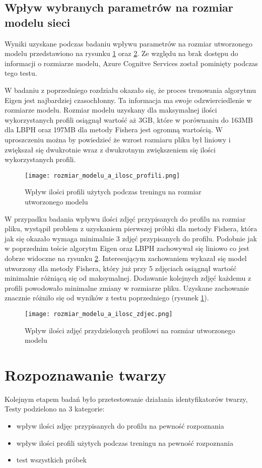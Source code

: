 \subsection{Wpływ wybranych parametrów na rozmiar modelu sieci}
Wyniki uzyskane podczas badaniu wpływu parametrów na rozmiar utworzonego modelu przedstawiono na rysunku \ref{fig:rozmiar_profile} oraz \ref{fig:rozmiar_zdjecia}. Ze względu na brak dostępu do informacji o rozmiarze modelu, Azure Cognitve Services został pominięty podczas tego testu.

W badaniu z poprzedniego rozdziału okazało się, że proces trenowania algorytmu Eigen jest najbardziej czasochłonny. Ta informacja ma swoje odzwierciedlenie w rozmiarze modelu. Rozmiar modelu uzyskany dla maksymalnej ilości wykorzystanych profili osiągnął wartość aż 3GB, które w porównaniu do 163MB dla LBPH oraz 197MB dla metody Fishera jest ogromną wartością. W uproszczeniu można by powiedzieć że wzrost rozmiaru pliku był liniowy i zwiększał się dwukrotnie wraz z dwukrotnym zwiększeniem się ilości wykorzystanych profili. 
\begin{figure}[H]
	\centering
	\texttt{[image: rozmiar\_modelu\_a\_ilosc\_profili.png]}
	\caption{Wpływ ilości profili użytych podczas treningu na rozmiar utworzonego modelu}
	\label{fig:rozmiar_profile}
\end{figure}
W przypadku badania wpływu ilości zdjęć przypisanych do profilu na rozmiar pliku, wystąpił problem z uzyskaniem pierwszej próbki dla metody Fishera, która jak się okazało wymaga minimalnie 3 zdjęć przypisanych do profilu. Podobnie jak w poprzednim teście algorytm Eigen oraz LBPH zachowywał się liniowo co jest dobrze widoczne na rysunku \ref{fig:rozmiar_zdjecia}. Interesującym zachowaniem wykazał się model utworzony dla metody Fishera, który już przy 5 zdjęciach osiągnął wartość minimalnie różniącą się od maksymalnej. Dodawanie kolejnych zdjęć każdemu z profili powodowało minimalne zmiany w rozmiarze pliku. Uzyskane zachowanie znacznie różniło się od wyników z testu poprzedniego (rysunek \ref{fig:rozmiar_profile}).
\begin{figure}[H]
	\centering
	\texttt{[image: rozmiar\_modelu\_a\_ilosc\_zdjec.png]}
	\caption{Wpływ ilości zdjęć przydzielonych profilowi na rozmiar utworzonego modelu}
	\label{fig:rozmiar_zdjecia}
\end{figure}

\section{Rozpoznawanie twarzy} \label{b:rozpoznawanie}
Kolejnym etapem badań było przetestowanie działania identyfikatorów twarzy, Testy podzielono na 3 kategorie:
\begin{itemize}
\item wpływ ilości zdjęc przypisanych do profilu na pewność rozpoznania
\item wpływ ilości profili użytych podczas treningu na pewność rozpoznania
\item test wszystkich próbek
\end{itemize}
